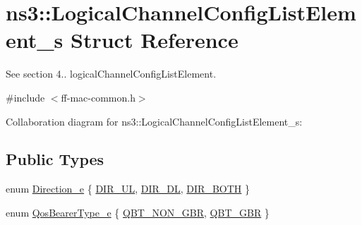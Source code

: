 \hypertarget{structns3_1_1LogicalChannelConfigListElement__s}{}\section{ns3\+:\+:Logical\+Channel\+Config\+List\+Element\+\_\+s Struct Reference}
\label{structns3_1_1LogicalChannelConfigListElement__s}


See section 4.. logical\+Channel\+Config\+List\+Element.  




{\ttfamily \#include $<$ff-\/mac-\/common.\+h$>$}



Collaboration diagram for ns3\+:\+:Logical\+Channel\+Config\+List\+Element\+\_\+s\+:
\subsection*{Public Types}
\begin{DoxyCompactItemize}
\item 
enum \hyperlink{structns3_1_1LogicalChannelConfigListElement__s_a0ce1e3a6af4d9a3e9fc19361d0af4e00}{Direction\+\_\+e} \{ \hyperlink{structns3_1_1LogicalChannelConfigListElement__s_a0ce1e3a6af4d9a3e9fc19361d0af4e00acc9eb2fd165cc693771639203d6212a9}{D\+I\+R\+\_\+\+UL}, 
\hyperlink{structns3_1_1LogicalChannelConfigListElement__s_a0ce1e3a6af4d9a3e9fc19361d0af4e00a31e389072f64c3e83e1da04be05ada0f}{D\+I\+R\+\_\+\+DL}, 
\hyperlink{structns3_1_1LogicalChannelConfigListElement__s_a0ce1e3a6af4d9a3e9fc19361d0af4e00abbf65338c16bef65cdedec87e8a7efaa}{D\+I\+R\+\_\+\+B\+O\+TH}
 \}
\item 
enum \hyperlink{structns3_1_1LogicalChannelConfigListElement__s_a4b3d593978adeb6b101b9492d89aad3e}{Qos\+Bearer\+Type\+\_\+e} \{ \hyperlink{structns3_1_1LogicalChannelConfigListElement__s_a4b3d593978adeb6b101b9492d89aad3eac20f0fbd558d34362f2e8c314723a55f}{Q\+B\+T\+\_\+\+N\+O\+N\+\_\+\+G\+BR}, 
\hyperlink{structns3_1_1LogicalChannelConfigListElement__s_a4b3d593978adeb6b101b9492d89aad3ea269c9a9e27278c110e664e9aa989bcf7}{Q\+B\+T\+\_\+\+G\+BR}
 \}
\end{DoxyCompactItemize}
